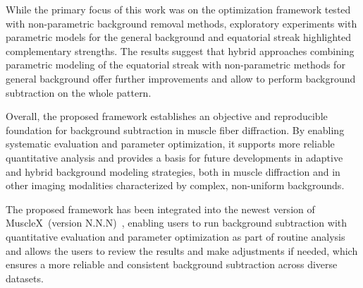 \documentclass[iucr]{iucrjournals}
\begin{document}


While the primary focus of this work was on the optimization framework tested with non-parametric background removal methods, exploratory experiments with parametric models for the general background and equatorial streak highlighted complementary strengths. The results suggest that hybrid approaches combining parametric modeling of the equatorial streak with non-parametric methods for general background offer further improvements and allow to perform background subtraction on the whole pattern.



Overall, the proposed framework establishes an objective and reproducible foundation for background subtraction in muscle fiber diffraction. By enabling systematic evaluation and parameter optimization, it supports more reliable quantitative analysis and provides a basis for future developments in adaptive and hybrid background modeling strategies, both in muscle diffraction and in other imaging modalities characterized by complex, non-uniform backgrounds.

The proposed framework has been integrated into the newest version of MuscleX~(version N.N.N)~\cite{lee2019musclex}, enabling users to run background subtraction with quantitative evaluation and parameter optimization as part of routine analysis and allows the users to review the results and make adjustments if needed, which ensures a more reliable and consistent background subtraction across diverse datasets. 
\end{document}

